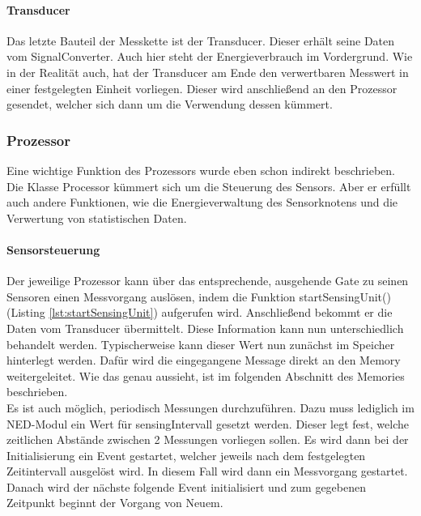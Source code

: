 \paragraph{Transducer}

Das letzte Bauteil der Messkette ist der Transducer. Dieser erhält seine Daten vom SignalConverter. Auch hier steht der Energieverbrauch im Vordergrund. Wie in der Realität auch, hat der Transducer am Ende den verwertbaren Messwert in einer festgelegten Einheit vorliegen. Dieser wird anschließend an den Prozessor gesendet, welcher sich dann um die Verwendung dessen kümmert.

\subsubsection{Prozessor}

Eine wichtige Funktion des Prozessors wurde eben schon indirekt beschrieben. Die Klasse Processor kümmert sich um die Steuerung des Sensors. Aber er erfüllt auch andere Funktionen, wie die Energieverwaltung des Sensorknotens und die Verwertung von statistischen Daten.

\paragraph{Sensorsteuerung}

Der jeweilige Prozessor kann über das entsprechende, ausgehende Gate zu seinen Sensoren einen Messvorgang auslösen, indem die Funktion startSensingUnit() (Listing \ref{lst:startSensingUnit}) aufgerufen wird. Anschließend bekommt er die Daten vom Transducer übermittelt. Diese Information kann nun unterschiedlich behandelt werden. Typischerweise kann dieser Wert nun zunächst im Speicher hinterlegt werden. Dafür wird die eingegangene Message direkt an den Memory weitergeleitet. Wie das genau aussieht, ist im folgenden Abschnitt des Memories beschrieben.\\
Es ist auch möglich, periodisch Messungen durchzuführen. Dazu muss lediglich im NED-Modul ein Wert für sensingIntervall gesetzt werden. Dieser legt fest, welche zeitlichen Abstände zwischen 2 Messungen vorliegen sollen. Es wird dann bei der Initialisierung ein Event gestartet, welcher jeweils nach dem festgelegten Zeitintervall ausgelöst wird. In diesem Fall wird dann ein Messvorgang gestartet. Danach wird der nächste folgende Event initialisiert und zum gegebenen Zeitpunkt beginnt der Vorgang von Neuem.

